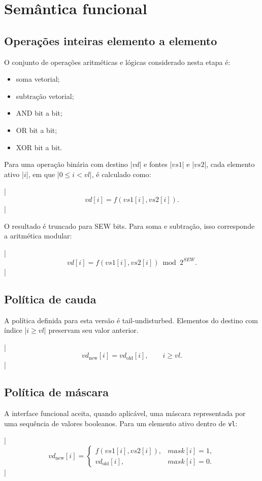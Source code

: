 \section{Semântica funcional}

\subsection{Operações inteiras elemento a elemento}

O conjunto de operações aritméticas e lógicas considerado nesta etapa é:

\begin{itemize}
    \item soma vetorial;
    \item subtração vetorial;
    \item AND bit a bit;
    \item OR bit a bit;
    \item XOR bit a bit.
\end{itemize}

Para uma operação binária com destino |$vd$| e fontes |$vs1$| e |$vs2$|,
cada elemento ativo |$i$|, em que |$0 \leq i < vl$|, é calculado como:

|$$
vd[i] = f(vs1[i],vs2[i]).
$$|

O resultado é truncado para SEW bits. Para soma e subtração, isso
corresponde a aritmética modular:

|$$
vd[i] = f(vs1[i],vs2[i]) \bmod 2^{SEW}.
$$|

\subsection{Política de cauda}

A política definida para esta versão é tail-undisturbed. Elementos do
destino com índice |$i \geq vl$| preservam seu valor anterior.

|$$
vd_{\text{new}}[i] = vd_{\text{old}}[i], \qquad i \geq vl.
$$|

\subsection{Política de máscara}

A interface funcional aceita, quando aplicável, uma máscara representada
por uma sequência de valores booleanos. Para um elemento ativo dentro de
\texttt{vl}:

|$$
vd_{\text{new}}[i] =
\begin{cases}
f(vs1[i],vs2[i]), & mask[i] = 1, \\
vd_{\text{old}}[i], & mask[i] = 0.
\end{cases}
$$|

